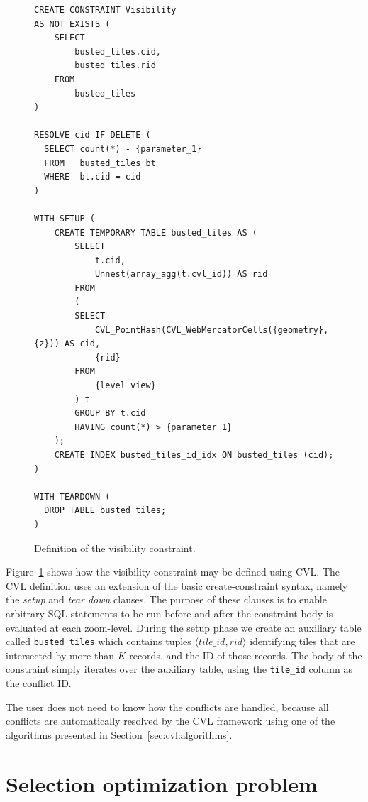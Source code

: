 \documentclass[11pt, oneside]{report}
\begin{document}
\begin{figure}[htbp]
\begin{center}
\begin{lstlisting}
CREATE CONSTRAINT Visibility
AS NOT EXISTS (
    SELECT
        busted_tiles.cid,
        busted_tiles.rid
    FROM
        busted_tiles
)

RESOLVE cid IF DELETE (
  SELECT count(*) - {parameter_1}
  FROM   busted_tiles bt
  WHERE  bt.cid = cid
)

WITH SETUP (
    CREATE TEMPORARY TABLE busted_tiles AS (
        SELECT
            t.cid,
            Unnest(array_agg(t.cvl_id)) AS rid
        FROM
        (
        SELECT
            CVL_PointHash(CVL_WebMercatorCells({geometry}, {z})) AS cid,
            {rid}
        FROM
            {level_view}
        ) t
        GROUP BY t.cid
        HAVING count(*) > {parameter_1}
    );
    CREATE INDEX busted_tiles_id_idx ON busted_tiles (cid);
)

WITH TEARDOWN (
  DROP TABLE busted_tiles;
)
\end{lstlisting}
\caption{Definition of the visibility constraint.}
\label{fig:visibility:definition}
\end{center}
\end{figure}



Figure~\ref{fig:visibility:definition} shows how the visibility constraint may be defined using CVL. The CVL definition uses an extension of the basic create-constraint syntax, namely the \emph{setup} and \emph{tear down} clauses. 
The purpose of these clauses is to enable arbitrary SQL statements to be run before and after the constraint body is evaluated at each zoom-level. During the setup phase we create an auxiliary table called \texttt{busted\_tiles} which contains tuples $\langle tile\_id, rid \rangle$ identifying tiles that are intersected by more than $K$ records, and the ID of those records. The body of the constraint simply iterates over the auxiliary table, using the \texttt{tile\_id} column as the conflict ID.

The user does not need to know how the conflicts are handled, because all conflicts are automatically resolved by the CVL framework using one of the algorithms presented in Section~\ref{sec:cvl:algorithms}.

\section{Selection optimization problem}
\label{sec:optimizationmodel}
\end{document}
